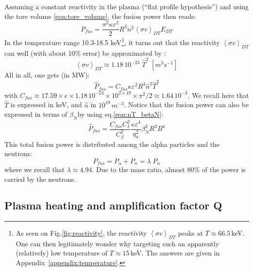 Assuming a constant reactivity in the plasma (``flat profile hypothesis'') and using the tore volume \ref{eqn:tore_volume}, the fusion power then reads:
\begin{equation*}
  P_{fus} = \frac{\pi^2 \kappa \varepsilon^2}{2} 
  R^3 n^2 \left< \sigma v \right>_{DT} E_{DT}
\end{equation*}
In the temperature range 10.3-18.5 keV\footnote{As seen on Fig.\ref{fig:reactivity}, the reactivity $\left< \sigma v \right>_{DT}$ peaks at $T\approx 66.5\,$keV. One can then legitimately wonder why targeting such an apparently (relatively) low temperature of $T\approx 15\,$keV. The answers are given in  Appendix~\ref{appendix:temperature}.}, it turns out that the reactivity $\left< \sigma v \right>_{DT}$ can well (with about 10$\%$ error) be approximated by \cite[(1.5.4)]{Wesson2004}: 
\begin{equation*}
  \left< \sigma v \right>_{DT} \approx 1.18\, 10^{-24}\; \hat T^2 \;\si{\left[m^3 s^{-1}\right]}
\end{equation*}
All in all, one gets (in MW):
\begin{equation}
  \hat P_{fus} = C_{fus} \kappa \varepsilon^2 R^3 \hat n^2 \hat T^2  
\label{eq:DT_fusion_power}
\end{equation}
with $C_{fus} \approx 17.59 \times e\times 1.18\, 10^{-24} \times 10^{2\times19}\times \pi^2/2 \approx 1.64\, 10^{-3}$. We recall here that $\hat T$ is expressed in keV, and $\hat n$ in $10^{19} \, \si{m^{-3}}$. 
Notice that the fusion power can also be expressed in terms of $\beta_N$by using eq.\ref{eqn:nT_betaN}:
\begin{equation}
  \hat P_{fus} = \frac{C_{fus}C_I^2}{C_\beta^2} \frac{\kappa \varepsilon^4}{q_a^2} 
    \beta_N^2 R^3 B^4 
\label{eq:DT_fusion_power_betaN}
\end{equation}
This total fusion power is distributed among the alpha particles and the neutrons: 
\begin{equation*}
  P_{fus} = P_\alpha + P_n = \lambda \; P_\alpha
  \label{eq:P_alpha}
\end{equation*}
where we recall that $\lambda \approx 4.94$. Due to the mass ratio, almost 80\% of the power is carried by the neutrons. 

\subsection{Plasma heating and amplification factor Q}

